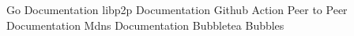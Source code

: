 \renewcommand{\refname}{Quellen}

Go Documentation \cite {go_docs}
libp2p Documentation \cite {libp2p_go_getting_started}
Github Action \cite {github_actions_docs}
Peer to Peer Documentation \cite {peer_to_peer}
Mdns Documentation \cite {mdns}
Bubbletea \cite {bubbletea}
Bubbles \cite {bubbles}

 


\newpage